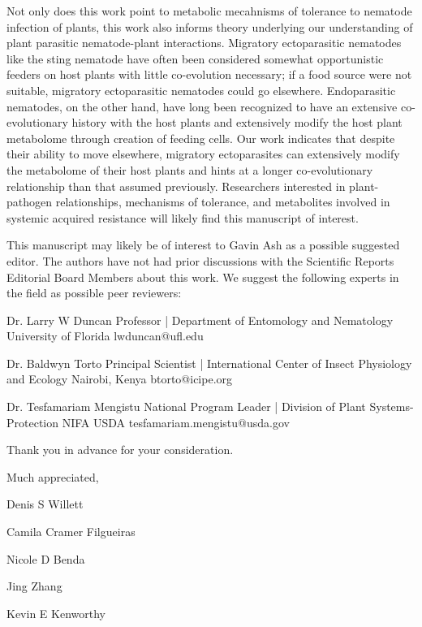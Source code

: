 \documentclass{article}
\begin{document}
Not only does this work point to metabolic mecahnisms of tolerance to nematode infection of plants, this work also informs theory underlying our understanding of plant parasitic nematode-plant interactions.  Migratory ectoparasitic nematodes like the sting nematode have often been considered somewhat opportunistic feeders on host plants with little co-evolution necessary; if a food source were not suitable, migratory ectoparasitic nematodes could go elsewhere.  Endoparasitic nematodes, on the other hand, have long been recognized to have an extensive co-evolutionary history with the host plants and extensively modify the host plant metabolome through creation of feeding cells.  Our work indicates that despite their ability to move elsewhere, migratory ectoparasites can extensively modify the metabolome of their host plants and hints at a longer co-evolutionary relationship than that assumed previously.  Researchers interested in plant-pathogen relationships, mechanisms of tolerance, and metabolites involved in systemic acquired resistance will likely find this manuscript of interest.  


This manuscript may likely be of interest to Gavin Ash as a possible suggested editor. The authors have not had prior discussions with the Scientific Reports Editorial Board Members about this work.  We suggest the following experts in the field as possible peer reviewers:


\setlength{\parindent}{0cm}
\begin{addmargin}[1in]{}

Dr. Larry W Duncan \newline
Professor | Department of Entomology and Nematology \newline
University of Florida \newline
lwduncan@ufl.edu \newline

Dr. Baldwyn Torto \newline
Principal Scientist | International Center of Insect Physiology and Ecology \newline
Nairobi, Kenya \newline
btorto@icipe.org \newline

Dr. Tesfamariam Mengistu \newline
National Program Leader | Division of Plant Systems-Protection \newline
NIFA USDA \newline
tesfamariam.mengistu@usda.gov \newline

\end{addmargin}

Thank you in advance for your consideration.  

\vspace{2em}

Much appreciated, \newline

\vspace{1em}

Denis S Willett
\vspace{0.48em}

Camila Cramer Filgueiras
\vspace{0.48em}

Nicole D Benda
\vspace{0.48em}

Jing Zhang
\vspace{0.48em} 

Kevin E Kenworthy
\end{document}
